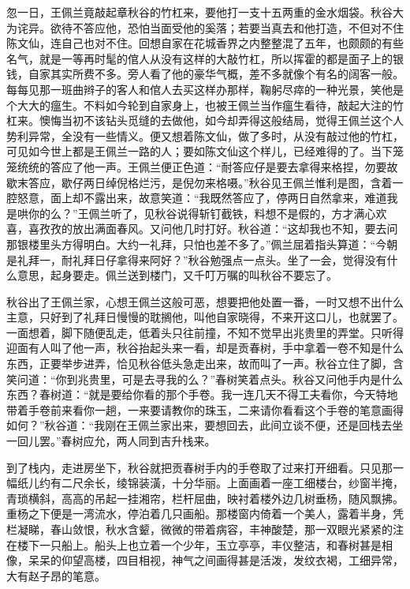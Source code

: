 \documentclass[12pt,UTF8]{ctexbook}
\begin{document}
{{{忽一日，王佩兰竟敲起章秋谷的竹杠来，要他打一支十五两重的金水烟袋。秋谷大为诧异。欲待不答应他，恐怕当面受他的奚落；若要当真去和他打造，不但对不住陈文仙，连自己也对不住。回想自家在花城香界之内整整混了五年，也颇颇的有些名气，就是一等再时髦的倌人从没有这样的大敲竹杠，所以挥霍的都是面子上的银钱，自家其实所费不多。旁人看了他的豪华气概，差不多就像个有名的阔客一般。每每见那一班曲辫子的客人和倌人去买这样办那样，鞠躬尽瘁的一种光景，笑他是个大大的瘟生。不料如今轮到自家身上，也被王佩兰当作瘟生看待，敲起大注的竹杠来。懊悔当初不该钻头觅缝的去做他，如今却弄得这般结局，觉得王佩兰这个人势利异常，全没有一些情义。便又想着陈文仙，做了多时，从没有敲过他的竹杠，可见如今世上都是王佩兰一路的人；要如陈文仙这个样儿，已经难得的了。当下笼笼统统的答应了他一声。王佩兰便正色道：“耐答应仔是要去拿得来格捏，勿要故歇末答应，歇仔两日绰倪格烂污，是倪勿来格嗫。”秋谷见王佩兰惟利是图，含着一腔怒意，面上却不露出来，故意笑道：“我既然答应了，停两日自然拿来，难道我是哄你的么？”王佩兰听了，见秋谷说得斩钉截铁，料想不是假的，方才满心欢喜，喜孜孜的放出满面春风。又问他几时打好。秋谷道：“这却我也不知，要去问那银楼里头方得明白。大约一礼拜，只怕也差不多了。”佩兰屈着指头算道：“今朝是礼拜一，耐礼拜日仔拿得来阿好？”秋谷勉强点一点头。坐了一会，觉得没有什么意思，起身要走。佩兰送到楼门，又千叮万嘱的叫秋谷不要忘了。

秋谷出了王佩兰家，心想王佩兰这般可恶，想要把他处置一番，一时又想不出什么主意，只好到了礼拜日慢慢的耽搁他，叫他自家晓得，不来开这口儿，也就罢了。一面想着，脚下随便乱走，低着头只往前撞，不知不觉早出兆贵里的弄堂。只听得迎面有人叫了他一声，秋谷抬起头来一看，却是贡春树，手中拿着一卷不知是什么东西，正要举步进弄，恰见秋谷低头急走出来，故而叫了一声。秋谷立住了脚，含笑问道：“你到兆贵里，可是去寻我的么？”春树笑着点头。秋谷又问他手内是什么东西？春树道：“就是要给你看的那个手卷。我一连几天不得工夫看你，今天特地带着手卷前来看你一趟，一来要请教你的珠玉，二来请你看看这个手卷的笔意画得如何？”秋谷道：“我刚在王佩兰家出来，要想回去，此间立谈不便，还是回栈去坐一回儿罢。”春树应允，两人同到吉升栈来。

到了栈内，走进房坐下，秋谷就把贡春树手内的手卷取了过来打开细看。只见那一幅纸儿约有二尺余长，绫锦装潢，十分华丽。上面画着一座工细楼台，纱窗半掩，青琐横斜，高高的吊起一挂湘帘，栏杆屈曲，映衬着楼外边几树垂杨，随风飘拂。重杨之下便是一湾流水，停泊着几只画船。那楼窗内倚着一个美人，露着半身，凭栏凝睇，春山敛恨，秋水含颦，微微的带着病容，丰神酸楚，那一双眼光紧紧的注在楼下一只船上。船头上也立着一个少年，玉立亭亭，丰仪整洁，和春树甚是相像，呆呆的仰望高楼，四目相视，神气之间画得甚是活泼，发纹衣褐，工细异常，大有赵子昂的笔意。

}}}
\end{document}
